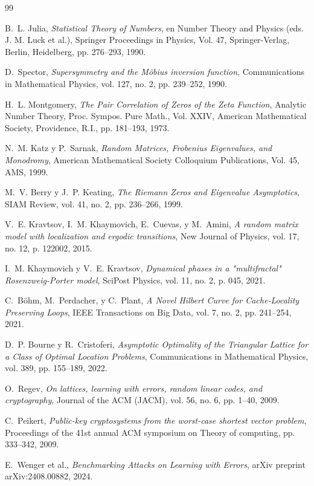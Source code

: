 \documentclass[12pt, a4paper]{article}
\theoremstyle{plain}
\theoremstyle{definition}
\theoremstyle{remark}
\begin{document}
\begin{thebibliography}{99}

B.~L. Julia,
\newblock \emph{Statistical Theory of Numbers},
\newblock en Number Theory and Physics (eds. J. M. Luck et al.), Springer Proceedings in Physics, Vol. 47, Springer-Verlag, Berlin, Heidelberg, pp. 276--293, 1990.

D.~Spector,
\newblock \emph{Supersymmetry and the Möbius inversion function},
\newblock Communications in Mathematical Physics, vol. 127, no. 2, pp. 239--252, 1990.

H.~L. Montgomery,
\newblock \emph{The Pair Correlation of Zeros of the Zeta Function},
\newblock Analytic Number Theory, Proc. Sympos. Pure Math., Vol. XXIV, American Mathematical Society, Providence, R.I., pp. 181--193, 1973.

N.~M. Katz y P.~Sarnak,
\newblock \emph{Random Matrices, Frobenius Eigenvalues, and Monodromy},
\newblock American Mathematical Society Colloquium Publications, Vol. 45, AMS, 1999.

M.~V. Berry y J.~P. Keating,
\newblock \emph{The Riemann Zeros and Eigenvalue Asymptotics},
\newblock SIAM Review, vol. 41, no. 2, pp. 236--266, 1999.

V.~E. Kravtsov, I.~M. Khaymovich, E.~Cuevas, y M.~Amini,
\newblock \emph{A random matrix model with localization and ergodic transitions},
\newblock New Journal of Physics, vol. 17, no. 12, p. 122002, 2015.

I.~M. Khaymovich y V.~E. Kravtsov,
\newblock \emph{Dynamical phases in a "multifractal" Rosenzweig-Porter model},
\newblock SciPost Physics, vol. 11, no. 2, p. 045, 2021.

C.~Böhm, M.~Perdacher, y C.~Plant,
\newblock \emph{A Novel Hilbert Curve for Cache-Locality Preserving Loops},
\newblock IEEE Transactions on Big Data, vol. 7, no. 2, pp. 241--254, 2021.

D.~P. Bourne y R.~Cristoferi,
\newblock \emph{Asymptotic Optimality of the Triangular Lattice for a Class of Optimal Location Problems},
\newblock Communications in Mathematical Physics, vol. 389, pp. 155--189, 2022.

O.~Regev,
\newblock \emph{On lattices, learning with errors, random linear codes, and cryptography},
\newblock Journal of the ACM (JACM), vol. 56, no. 6, pp. 1--40, 2009.

C.~Peikert,
\newblock \emph{Public-key cryptosystems from the worst-case shortest vector problem},
\newblock Proceedings of the 41st annual ACM symposium on Theory of computing, pp. 333--342, 2009.

E.~Wenger et al.,
\newblock \emph{Benchmarking Attacks on Learning with Errors},
\newblock arXiv preprint arXiv:2408.00882, 2024.

\end{thebibliography}
\end{document}
